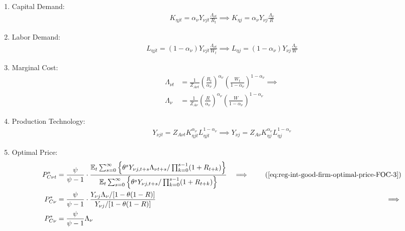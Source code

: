 \documentclass[
thesis.tex
]{subfiles}
\begin{document}
\begin{enumerate}
	\item Capital Demand:
	\begin{align}
		K_{\eta jt} = {\alpha_\nu} Y_{\nu jt} \frac{\Lambda_{\nu t}}{R_t} \implies K_{\eta j} = {\alpha_\nu} Y_{\nu j} \frac{\Lambda_{\nu}}{R} \label{eq:reg-ss-int-good-firm-FOC-Kt}
	\end{align}
	
	\item Labor Demand:
	\begin{align}
		L_{\eta jt} = (1-{\alpha_\nu}) Y_{\nu jt} \frac{\Lambda_{\nu t}}{W_t} \implies L_{\eta j} = (1 -{\alpha_\nu}) Y_{\nu j} \frac{\Lambda_{\nu}}{W} \label{eq:reg-ss-int-good-firm-FOC-Lt}
	\end{align}
	
	
	\item Marginal Cost:
	\begin{align}
		\Lambda_{\nu t} &= \frac{1}{Z_{A\nu t}} \left( \frac{R_t}{{\alpha_\nu}} \right)^{{\alpha_\nu}} \left( \frac{W_t}{1-{\alpha_\nu}} \right)^{1-{\alpha_\nu}} \implies \nonumber \\
		\Lambda_{\nu} &= \frac{1}{Z_{A\nu}} \left( \frac{R}{{\alpha_\nu}} \right)^{{\alpha_\nu}} \left( \frac{W}{1-{\alpha_\nu}} \right)^{1-{\alpha_\nu}} \label{eq:reg-ss-int-good-firm-MC-2}
	\end{align}
	
	\item Production Technology:
	\begin{align}
		Y_{\nu jt} = Z_{A\nu t} K_{\eta jt}^{\alpha_\nu} L_{\eta jt}^{1-{\alpha_\nu}} \implies Y_{\nu j} = Z_{A\nu} K_{\eta j}^{\alpha_\nu} L_{\eta j}^{1-{\alpha_\nu}} \label{eq:reg-ss-int-good-firm-production-function}
	\end{align}
	
	\item Optimal Price:
	\begin{alignat}{2}
		P_{C\nu t}^\ast &= \frac{\psi}{\psi-1} \cdot \frac{\E \sum_{s=0}^{\infty} \left\{\theta^s Y_{\nu j,t+s} \Lambda_{\nu t+s} / \prod_{k=0}^{s-1}(1+R_{t+k}) \right\}} {\E \sum_{s=0}^{\infty} \left\{ \theta^s Y_{\nu j,t+s} / \prod_{k=0}^{s-1}(1+R_{t+k}) \right\}} &\implies \tag{\ref{eq:reg-int-good-firm-optimal-price-FOC-3}} \\
		P_{C\nu}^\ast &= \frac{\psi}{\psi-1} \cdot \frac{ Y_{\nu j} \Lambda_{\nu} / [1-\theta(1-R)]} {Y_{\nu j} / [1-\theta(1-R)]} &\implies \nonumber \\
		P_{C\nu}^\ast &= \frac{\psi}{\psi-1} \Lambda_{\nu} \label{eq:reg-ss-int-good-firm-optimal-price-FOC-3}
	\end{alignat}
	

\end{enumerate}
\end{document}
